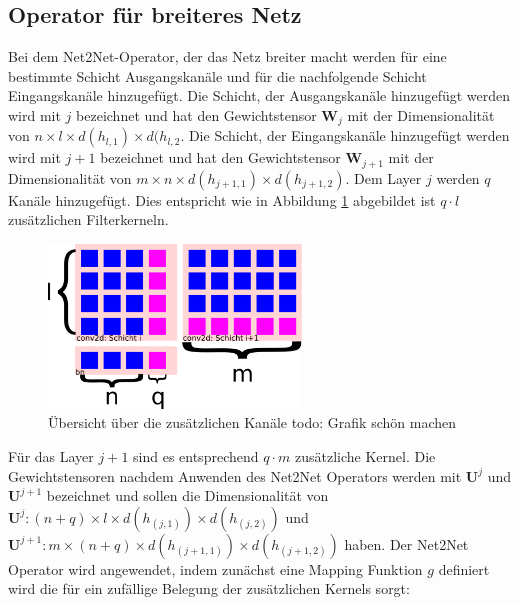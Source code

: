 \subsection{Operator für breiteres Netz}
Bei dem Net2Net-Operator, der das Netz breiter macht werden für eine bestimmte Schicht Ausgangskanäle und für die nachfolgende Schicht Eingangskanäle hinzugefügt. Die Schicht, der Ausgangskanäle hinzugefügt werden wird mit $j$ bezeichnet und hat den Gewichtstensor $\mathbf{W}_j$ mit der Dimensionalität von $n \times l \times d(h_{l,1}) \times d(h_{l,2}$. Die Schicht, der Eingangskanäle hinzugefügt werden wird mit $j+1$ bezeichnet und hat den Gewichtstensor $\mathbf{W}_{j+1}$ mit der Dimensionalität von $m \times n \times d(h_{j+1,1}) \times d(h_{j+1,2})$. Dem Layer $j$ werden $q$ Kanäle hinzugefügt. Dies entspricht wie in Abbildung \ref{abb:channels} abgebildet ist $q \cdot l $ zusätzlichen Filterkerneln. 
\begin{figure}[h]
 \centering
 \includegraphics[width=0.6\textwidth]{KapitelPartA/images/channels.png}
 \caption{Übersicht über die zusätzlichen Kanäle todo: Grafik schön machen}
\label{abb:channels}
 \end{figure}



Für das Layer $j+1$ sind es entsprechend $q \cdot m $ zusätzliche Kernel. Die Gewichtstensoren nachdem Anwenden des Net2Net Operators werden mit $\mathbf{U}^j$ und $\mathbf{U}^{j+1}$ bezeichnet und sollen die Dimensionalität von $\mathbf{U}^j: (n+q) \times l \times d(h_{(j,1)}) \times d(h_{(j,2)})$ und $\mathbf{U}^{j+1}: m \times (n+q) \times d(h_{(j+1,1)}) \times d(h_{(j+1,2)})$ haben. Der Net2Net Operator wird angewendet, indem zunächst eine Mapping Funktion $g$ definiert wird die für ein zufällige Belegung der zusätzlichen Kernels sorgt:


